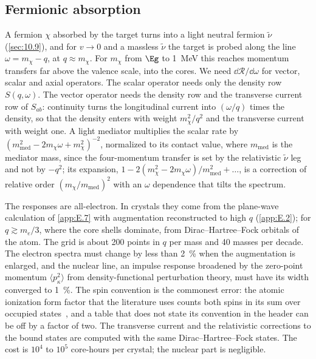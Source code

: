 \subsection{Fermionic absorption}

A fermion $\chi$ absorbed by the target turns into a light neutral fermion $\tilde\nu$ (\cref{sec:10.9}), and for $v \to 0$ and a massless $\tilde\nu$ the target is probed along the line $\omega = m_\chi - q$, at $q \approx m_\chi$. For $m_\chi$ from $\Eg$ to \SI{1}{MeV} this reaches momentum transfers far above the valence scale, into the cores. We need $\dd\mathcal{R}/\dd\omega$ for vector, scalar and axial operators. The scalar operator needs only the density row $S(q, \omega)$. The vector operator needs the density row and the transverse current row of $S_{ab}$: continuity turns the longitudinal current into $(\omega/q)$ times the density, so that the density enters with weight $m_\chi^2/q^2$ and the transverse current with weight one. A light mediator multiplies the scalar rate by $(m_{\mathrm{med}}^2 - 2m_\chi\omega + m_\chi^2)^{-2}$, normalized to its contact value, where $m_{\mathrm{med}}$ is the mediator mass, since the four-momentum transfer is set by the relativistic $\tilde\nu$ leg and not by $-q^2$; its expansion, $1 - 2(m_\chi^2 - 2m_\chi\omega)/m_{\mathrm{med}}^2 + \dots$, is a correction of relative order $(m_\chi/m_{\mathrm{med}})^2$ with an $\omega$ dependence that tilts the spectrum.

The responses are all-electron. In crystals they come from the plane-wave calculation of \cref{app:E.7} with augmentation reconstructed to high $q$ (\cref{app:E.2}); for $q \gtrsim m_e/3$, where the core shells dominate, from Dirac--Hartree--Fock orbitals of the atom. The grid is about 200 points in $q$ per mass and 40 masses per decade. The electron spectra must change by less than \SI{2}{\percent} when the augmentation is enlarged, and the nuclear line, an impulse response broadened by the zero-point momentum $\langle p_\kappa^2\rangle$ from density-functional perturbation theory, must have its width converged to \SI{1}{\percent}. The spin convention is the commonest error: the atomic ionization form factor that the literature uses counts both spins in its sum over occupied states~\cite[Eqs.~(A.18)--(A.21)]{essig2016direct}, and a table that does not state its convention in the header can be off by a factor of two. The transverse current and the relativistic corrections to the bound states are computed with the same Dirac--Hartree--Fock states. The cost is $10^{4}$ to $10^{5}$ core-hours per crystal; the nuclear part is negligible.

